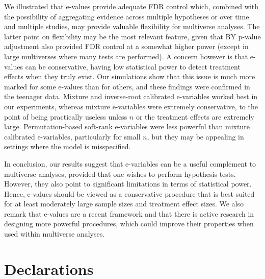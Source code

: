 \documentclass[pdflatex,sn-mathphys-num]{sn-jnl}%
\theoremstyle{thmstyleone}%
\theoremstyle{thmstyletwo}%
\theoremstyle{thmstylethree}%
\begin{document}
\color{blue} We illustrated that e-values provide adequate FDR control which, combined with the possibility of aggregating evidence across multiple hypotheses or over time and multiple studies, may provide valuable flexibility for multiverse analyses. The latter point on flexibility may be the most relevant feature, given that BY p-value adjustment also provided FDR control at a somewhat higher power (except in large multiverses where many tests are performed). \color{black}
A concern however is that e-values can be conservative, having low statistical power to detect treatment effects when they truly exist. Our simulations show that this issue is much more marked for some e-values than for others, and these findings were confirmed in the teenager data. Mixture and inverse-root calibrated e-variables worked best in our experiments, whereas mixture e-variables were extremely conservative, to the point of being practically useless unless $n$ or the treatment effects are extremely large. Permutation-based soft-rank e-variables were less powerful than mixture calibrated e-variables, particularly for small $n$, but they may be appealing in settings where the model is misspecified.

In conclusion, our results suggest that e-variables can be a useful complement to multiverse analyses, provided that one wishes to perform hypothesis tests. However, they also point to significant limitations in terms of statistical power. Hence, e-values should be viewed as a conservative procedure that is best suited for at least moderately large sample sizes and treatment effect sizes. We also remark that e-values are a recent framework and that there is active research in designing more powerful procedures, which could improve their properties when used within multiverse analyses.


\backmatter

% 
% 


\section*{Declarations}
\end{document}
